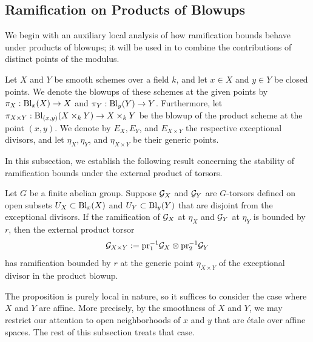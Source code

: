 
\subsection{Ramification on Products of Blowups}\label{subsection:ram_prod_analysis}

We begin with an auxiliary local analysis of how ramification bounds behave
under products of blowups; it will be used in
 to combine the contributions of
distinct points of the modulus.

Let $X$ and $Y$ be smooth schemes over a field $k$, and let $x \in X$ and $y \in Y$ be closed points.
We denote the blowups of these schemes at the given points by
$\pi_X: \operatorname{Bl}_x(X) \to X$ and $\pi_Y: \operatorname{Bl}_y(Y) \to Y$. Furthermore, let $\pi_{X \times Y}: \operatorname{Bl}_{(x,y)}(X \times_k Y) \to X \times_k Y$
be the blowup of the product scheme at the point $(x,y)$.
We denote by $E_X, E_Y$, and $E_{X \times Y}$ the respective exceptional divisors, and let $\eta_X, \eta_Y$, and $\eta_{X \times Y}$ be their generic points.

In this subsection, we establish the following result concerning the stability of ramification bounds under the external product of torsors.

\begin{prop}\label{prop:ramification-external-product}
Let $G$ be a finite abelian group. Suppose $\mathcal{G}_X$ and $\mathcal{G}_Y$ are $G$-torsors defined on open subsets $U_X \subset \operatorname{Bl}_x(X)$ and $U_Y \subset \operatorname{Bl}_y(Y)$ that are disjoint
from the exceptional divisors.
If the ramification of $\mathcal{G}_X$ at $\eta_X$ and $\mathcal{G}_Y$ at $\eta_Y$ is bounded by $r$, then the external product torsor
\[
\mathcal{G}_{X \times Y} := \text{pr}_1^{-1} \mathcal{G}_X \otimes \text{pr}_2^{-1} \mathcal{G}_Y
\]
has ramification bounded by $r$ at the generic point $\eta_{X\times Y}$ of the exceptional divisor in the product blowup.
\end{prop}

The proposition is purely local in nature, so it suffices to consider the case where $X$ and $Y$ are affine.
More precisely, by the smoothness of $X$ and $Y$, we may restrict our attention to open neighborhoods of $x$ and $y$ that are \'etale over affine spaces.
The rest of this subsection treats that case.

